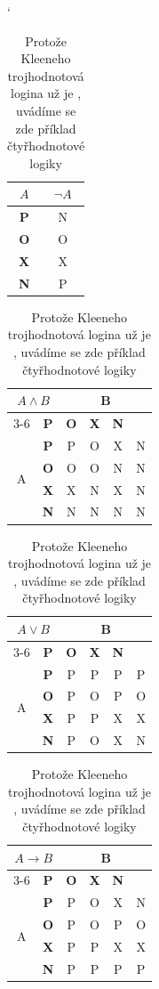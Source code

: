 \documentclass[a4paper,11pt]{article}
\begin{document}
\begin{table}[ht] \catcode`
    \centering
    \begin{tabular}{|c|c|} \hline
        $A$ & $\neg A$ \\ \hline
        \textbf{P} & N \\ \hline
        \textbf{O} & O \\ \hline
        \textbf{X} & X \\ \hline
        \textbf{N} & P \\ \hline
    \end{tabular}
    \begin{tabular}{|c|c|c|c|c|c|} \hline
        \multicolumn{2}{|c|}{\multirow{2}{*}{$A \wedge B$}} & \multicolumn{4}{c|}{B} \\ \cline{3-6}
        \multicolumn{2}{|c|}{} & \textbf{P} & \textbf{O} & \textbf{X} & \textbf{N} \\ \hline
        \multirow{4}{*}{A}  & \textbf{P} & P & O & X & N \\ \cline{2-6}
                            & \textbf{O} & O & O & N & N \\ \cline{2-6}
                            & \textbf{X} & X & N & X & N \\ \cline{2-6}
                            & \textbf{N} & N & N & N & N \\ \hline
    \end{tabular}
    \begin{tabular}{|c|c|c|c|c|c|} \hline
        \multicolumn{2}{|c|}{\multirow{2}{*}{$A \vee B$}} & \multicolumn{4}{c|}{B} \\ \cline{3-6}
        \multicolumn{2}{|c|}{} & \textbf{P} & \textbf{O} & \textbf{X} & \textbf{N} \\ \hline
        \multirow{4}{*}{A}  & \textbf{P} & P & P & P & P \\ \cline{2-6}
                            & \textbf{O} & P & O & P & O \\ \cline{2-6}
                            & \textbf{X} & P & P & X & X \\ \cline{2-6}
                            & \textbf{N} & P & O & X & N \\ \hline
    \end{tabular}
    \begin{tabular}{|c|c|c|c|c|c|} \hline
        \multicolumn{2}{|c|}{\multirow{2}{*}{$A \rightarrow B$}} & \multicolumn{4}{c|}{B} \\ \cline{3-6}
        \multicolumn{2}{|c|}{} & \textbf{P} & \textbf{O} & \textbf{X} & \textbf{N} \\ \hline
        \multirow{4}{*}{A}  & \textbf{P} & P & O & X & N \\ \cline{2-6}
                            & \textbf{O} & P & O & P & O \\ \cline{2-6}
                            & \textbf{X} & P & P & X & X \\ \cline{2-6}
                            & \textbf{N} & P & P & P & P \\ \hline
    \end{tabular}
    \caption{Protože Kleeneho trojhodnotová logina už je , uvádíme se zde příklad čtyřhodnotové logiky}
    \label{tab:my_label}
\end{table}
\end{document}
